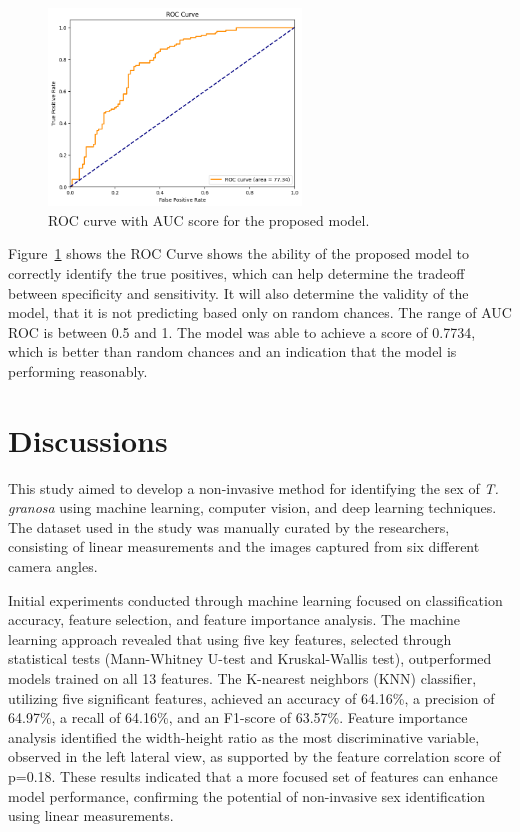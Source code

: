 \begin{figure}[!htbp]
	\centering
	\includegraphics[width=0.6\textwidth]{figures/roc.png}
	\caption{ROC curve with AUC score for the proposed model.}
	\label{fig:roc_auc}
\end{figure}

Figure~\ref{fig:roc_auc} shows the ROC Curve shows the ability of the proposed model to correctly identify the true positives, which can help determine the tradeoff between specificity and sensitivity. It will also determine the validity of the model, that it is not predicting based only on random chances. The range of AUC ROC is between 0.5 and 1. The model was able to achieve a score of 0.7734, which is better than random chances and an indication that the model is performing reasonably. 

\section{Discussions}

This study aimed to develop a non-invasive method for identifying the sex of \textit{T. granosa} using machine learning, computer vision, and deep learning techniques. The dataset used in the study was manually curated by the researchers, consisting of linear measurements and the images captured from six different camera angles.

Initial experiments conducted through machine learning focused on classification accuracy, feature selection, and feature importance analysis. The machine learning approach revealed that using five key features, selected through statistical tests (Mann-Whitney U-test and Kruskal-Wallis test), outperformed models trained on all 13 features. The K-nearest neighbors (KNN) classifier, utilizing five significant features, achieved an accuracy of 64.16\%, a precision of 64.97\%, a recall of 64.16\%, and an F1-score of 63.57\%. Feature importance analysis identified the width-height ratio as the most discriminative variable, observed in the left lateral view, as supported by the feature correlation score of p=0.18. These results indicated that a more focused set of features can enhance model performance, confirming the potential of non-invasive sex identification using linear measurements. 

